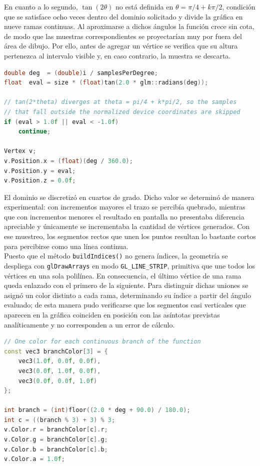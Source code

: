 En cuanto a lo segundo, $\tan(2\theta)$ no está definida en $\theta = \pi/4 + k\pi/2$, condición que se satisface ocho veces dentro del dominio solicitado y divide la gráfica en nueve ramas continuas. Al aproximarse a dichos ángulos la función crece sin cota, de modo que las muestras correspondientes se proyectarían muy por fuera del área de dibujo. Por ello, antes de agregar un vértice se verifica que su altura pertenezca al intervalo visible y, en caso contrario, la muestra se descarta.\\

\begin{lstlisting}[language=C++, caption={Evaluación, mapeo y filtrado de las muestras en MathFunction.h.}]
double deg  = (double)i / samplesPerDegree;
float  eval = size * (float)tan(2.0 * glm::radians(deg));

// tan(2*theta) diverges at theta = pi/4 + k*pi/2, so the samples
// that fall outside the normalized device coordinates are skipped
if (eval > 1.0f || eval < -1.0f)
    continue;

Vertex v;
v.Position.x = (float)(deg / 360.0);
v.Position.y = eval;
v.Position.z = 0.0f;
\end{lstlisting}

El dominio se discretizó en cuartos de grado. Dicho valor se determinó de manera experimental: con incrementos mayores el trazo se percibía quebrado, mientras que con incrementos menores el resultado en pantalla no presentaba diferencia apreciable y únicamente se incrementaba la cantidad de vértices generados. Con ese muestreo, los segmentos rectos que unen los puntos resultan lo bastante cortos para percibirse como una línea continua.\\

Puesto que el método \texttt{buildIndices()} no genera índices, la geometría se despliega con \texttt{glDrawArrays} en modo \texttt{GL\_LINE\_STRIP}, primitiva que une todos los vértices en una sola polilínea. En consecuencia, el último vértice de una rama queda enlazado con el primero de la siguiente. Para distinguir dichas uniones se asignó un color distinto a cada rama, determinando su índice a partir del ángulo evaluado; de esta manera pudo verificarse que los segmentos casi verticales que aparecen en la gráfica coinciden en posición con las asíntotas previstas analíticamente y no corresponden a un error de cálculo.\\

\begin{lstlisting}[language=C++, caption={Asignación de un color por rama de la función en MathFunction.h.}]
// One color for each continuous branch of the function
const vec3 branchColor[3] = {
    vec3(1.0f, 0.0f, 0.0f),
    vec3(0.0f, 1.0f, 0.0f),
    vec3(0.0f, 0.0f, 1.0f)
};

int branch = (int)floor((2.0 * deg + 90.0) / 180.0);
int c = ((branch % 3) + 3) % 3;
v.Color.r = branchColor[c].r;
v.Color.g = branchColor[c].g;
v.Color.b = branchColor[c].b;
v.Color.a = 1.0f;
\end{lstlisting}

